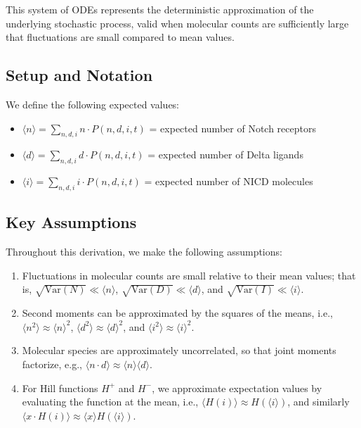 \documentclass{article}
\begin{document}
\begin{flushleft}
This system of ODEs represents the deterministic approximation of the underlying stochastic process, valid when molecular counts are sufficiently large that fluctuations are small compared to mean values.

\subsection*{Setup and Notation}

We define the following expected values:
\begin{itemize}
  \item $\langle n \rangle = \sum_{n,d,i} n \cdot P(n,d,i,t)$ = expected number of Notch receptors
  \item $\langle d \rangle = \sum_{n,d,i} d \cdot P(n,d,i,t)$ = expected number of Delta ligands
  \item $\langle i \rangle = \sum_{n,d,i} i \cdot P(n,d,i,t)$ = expected number of NICD molecules
\end{itemize}

\subsection*{Key Assumptions}
Throughout this derivation, we make the following assumptions:
\begin{enumerate}
  \item Fluctuations in molecular counts are small relative to their mean values; that is, $\sqrt{\text{Var}(N)} \ll \langle n \rangle$, $\sqrt{\text{Var}(D)} \ll \langle d \rangle$, and $\sqrt{\text{Var}(I)} \ll \langle i \rangle$.
  
  \item Second moments can be approximated by the squares of the means, i.e., $\langle n^2 \rangle \approx \langle n \rangle^2$, $\langle d^2 \rangle \approx \langle d \rangle^2$, and $\langle i^2 \rangle \approx \langle i \rangle^2$.
  
  \item Molecular species are approximately uncorrelated, so that joint moments factorize, e.g., $\langle n \cdot d \rangle \approx \langle n \rangle \langle d \rangle$.
  
  \item For Hill functions $H^+$ and $H^-$, we approximate expectation values by evaluating the function at the mean, i.e., $\langle H(i) \rangle \approx H(\langle i \rangle)$, and similarly $\langle x \cdot H(i) \rangle \approx \langle x \rangle H(\langle i \rangle)$.
\end{enumerate}


\end{flushleft}
\end{document}
